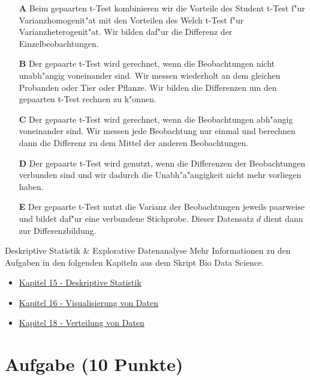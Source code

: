 \documentclass[a4paper, 10pt]{scrartcl}\usepackage[]{graphicx}\usepackage[]{xcolor}
\begin{document}
\begin{enumerate}
\item [\textbf{A} \msquare] Beim gepaarten t-Test kombinieren wir die Vorteile des Student t-Test f{"u}r Varianzhomogenit{"a}t mit den Vorteilen des Welch t-Test f{"u}r Varianzheterogenit{"a}t. Wir bilden daf{"u}r die Differenz der Einzelbeobachtungen.
\item [\textbf{B} \msquare] Der gepaarte t-Test wird gerechnet, wenn die Beobachtungen nicht unabh{"a}ngig voneinander sind. Wir messen wiederholt an dem gleichen Probanden oder Tier oder Pflanze. Wir bilden die Differenzen um den gepaarten t-Test rechnen zu k{"o}nnen.
\item [\textbf{C} \msquare] Der gepaarte t-Test wird gerechnet, wenn die Beobachtungen abh{"a}ngig voneinander sind. Wir messen jede Beobachtung nur einmal und berechnen dann die Differenz zu dem Mittel der anderen Beobachtungen.
\item [\textbf{D} \msquare] Der gepaarte t-Test wird genutzt, wenn die Differenzen der Beobachtungen verbunden sind und wir dadurch die Unabh{"a}{"a}ngigkeit nicht mehr vorliegen haben.
\item [\textbf{E} \msquare] Der gepaarte t-Test nutzt die Varianz der Beobachtungen jeweils paarweise und bildet daf{"u}r eine verbundene Stichprobe. Dieser Datensatz $d$ dient dann zur Differenzbildung.
\end{enumerate}   
\clearpage
\begin{graybox}{Deskriptive Statistik \& Explorative Datenanalyse}
Mehr Informationen zu den Aufgaben in den folgenden Kapiteln aus dem Skript Bio Data Science.
  \begin{itemize}
  \item \href{https://jkruppa.github.io/eda-descriptive.html}{Kapitel 15 - Deskriptive Statistik}
  \item \href{https://jkruppa.github.io/eda-ggplot.html}{Kapitel 16 - Visualisierung von Daten}
  \item \href{https://jkruppa.github.io/eda-distribution.html}{Kapitel 18 - Verteilung von Daten}
  \end{itemize}
\end{graybox}

\section{Aufgabe \hfill (10 Punkte)}
\end{document}
